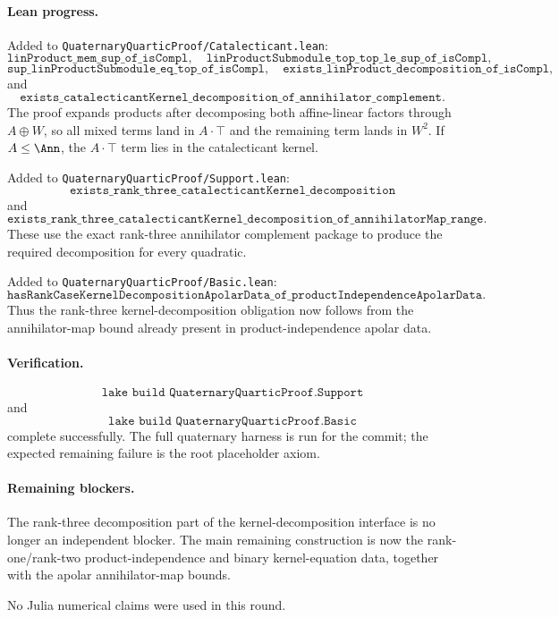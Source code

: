 \documentclass[11pt]{article}
\begin{document}
\paragraph{Lean progress.}
Added to \texttt{QuaternaryQuarticProof/Catalecticant.lean}:
\[
\texttt{linProduct\_mem\_sup\_of\_isCompl},
\quad
\texttt{linProductSubmodule\_top\_top\_le\_sup\_of\_isCompl},
\]
\[
\texttt{sup\_linProductSubmodule\_eq\_top\_of\_isCompl},
\quad
\texttt{exists\_linProduct\_decomposition\_of\_isCompl},
\]
and
\[
\texttt{exists\_catalecticantKernel\_decomposition\_of\_annihilator\_complement}.
\]
The proof expands products after decomposing both affine-linear factors through
\(A\oplus W\), so all mixed terms land in \(A\cdot\top\) and the remaining term
lands in \(W^2\).  If \(A\le\Ann\), the \(A\cdot\top\) term lies in the
catalecticant kernel.

Added to \texttt{QuaternaryQuarticProof/Support.lean}:
\[
\texttt{exists\_rank\_three\_catalecticantKernel\_decomposition}
\]
and
\[
\texttt{exists\_rank\_three\_catalecticantKernel\_decomposition\_of\_annihilatorMap\_range}.
\]
These use the exact rank-three annihilator complement package to produce the
required decomposition for every quadratic.

Added to \texttt{QuaternaryQuarticProof/Basic.lean}:
\[
\texttt{hasRankCaseKernelDecompositionApolarData\_of\_productIndependenceApolarData}.
\]
Thus the rank-three kernel-decomposition obligation now follows from the
annihilator-map bound already present in product-independence apolar data.

\paragraph{Verification.}
\[
\texttt{lake build QuaternaryQuarticProof.Support}
\]
and
\[
\texttt{lake build QuaternaryQuarticProof.Basic}
\]
complete successfully.  The full quaternary harness is run for the commit; the
expected remaining failure is the root placeholder axiom.

\paragraph{Remaining blockers.}
The rank-three decomposition part of the kernel-decomposition interface is no
longer an independent blocker.  The main remaining construction is now the
rank-one/rank-two product-independence and binary kernel-equation data,
together with the apolar annihilator-map bounds.

No Julia numerical claims were used in this round.
\end{document}
